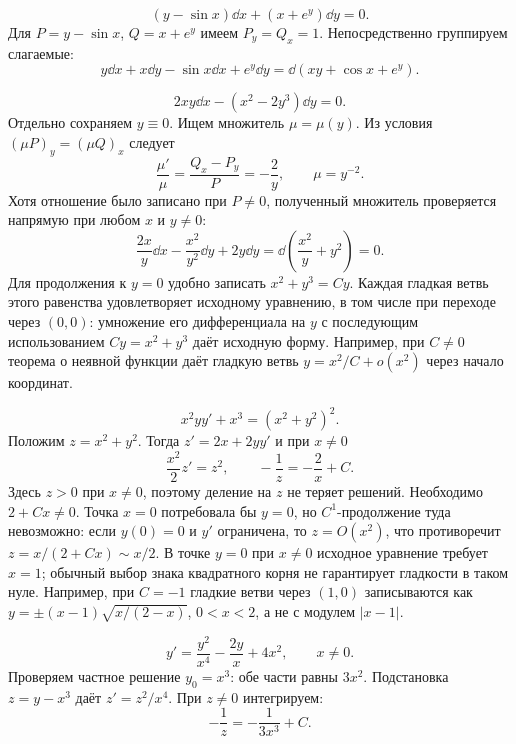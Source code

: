 \[
 (y-\sin x)\dd x+(x+e^y)\dd y=0.
\]
Для $P=y-\sin x$, $Q=x+e^y$ имеем $P_y=Q_x=1$.
Непосредственно группируем слагаемые:
\[
 y\dd x+x\dd y-\sin x\dd x+e^y\dd y
 =\dd(xy+\cos x+e^y).
\]

\[
 2xy\dd x-(x^2-2y^3)\dd y=0.
\]
Отдельно сохраняем $y\equiv0$. Ищем множитель $\mu=\mu(y)$.
Из условия $(\mu P)_y=(\mu Q)_x$ следует
\[
 \frac{\mu'}\mu=\frac{Q_x-P_y}{P}=-\frac2y,
 \qquad \mu=y^{-2}.
\]
Хотя отношение было записано при $P\ne0$, полученный множитель
проверяется напрямую при любом $x$ и $y\ne0$:
\[
 \frac{2x}{y}\dd x-\frac{x^2}{y^2}\dd y+2y\dd y
 =\dd\left(\frac{x^2}{y}+y^2\right)=0.
\]
Для продолжения к $y=0$ удобно записать $x^2+y^3=Cy$.
Каждая гладкая ветвь этого равенства удовлетворяет исходному уравнению,
в том числе при переходе через $(0,0)$: умножение его дифференциала
на $y$ с последующим использованием $Cy=x^2+y^3$ даёт исходную форму.
Например, при $C\ne0$ теорема о неявной функции даёт гладкую ветвь
$y=x^2/C+o(x^2)$ через начало координат.

\[
 x^2yy'+x^3=(x^2+y^2)^2.
\]
Положим $z=x^2+y^2$. Тогда $z'=2x+2yy'$ и при $x\ne0$
\[
 \frac{x^2}{2}z'=z^2,\qquad
 -\frac1z=-\frac2x+C.
\]
Здесь $z>0$ при $x\ne0$, поэтому деление на $z$ не теряет решений.
Необходимо $2+Cx\ne0$. Точка $x=0$ потребовала бы $y=0$,
но $C^1$-продолжение туда невозможно: если $y(0)=0$ и $y'$ ограничена,
то $z=O(x^2)$, что противоречит $z=x/(2+Cx)\sim x/2$.
В точке $y=0$ при $x\ne0$ исходное уравнение требует $x=1$;
обычный выбор знака квадратного корня не гарантирует гладкости в таком нуле.
Например, при $C=-1$ гладкие ветви через $(1,0)$ записываются как
$y=\pm(x-1)\sqrt{x/(2-x)}$, $0<x<2$, а не с модулем $|x-1|$.

\[
 y'=\frac{y^2}{x^4}-\frac{2y}{x}+4x^2,\qquad x\ne0.
\]
Проверяем частное решение $y_0=x^3$: обе части равны $3x^2$.
Подстановка $z=y-x^3$ даёт $z'=z^2/x^4$.
При $z\ne0$ интегрируем:
\[
 -\frac1z=-\frac1{3x^3}+C.
\]
